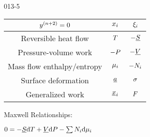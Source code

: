 \begin{mitframe}{013-5} %

    

\begin{longtable}{ | c | c | c | } 
 \hline
 	$ y^{(n+2)}= \init$& $\conjcoor$ & $\conjcoortwo_{\state}$ \\ \hline
	Reversible heat flow & $\Temp$ & $-\uline{\entropy}$ \\ \hline 
	Pressure-volume work & $-\p$ & $-\uline{\vol}$  \\ \hline
 	Mass flow enthalpy/entropy& $\chempot_{\state}$ & $-\nummoles_{\state}$ \\ \hline   
	Surface deformation & $\totalsa$ & $\surftens$ \\ \hline   
    Generalized work & $\gendisp_{\state}$ & $\force$ \\ \hline
 
 
 
\end{longtable}

    
    
\begin{listone}
        
    \item Maxwell Relationships:
        
    \item $\init = -\uline{\entropy}\mathrm{d}\Temp + \uline{\vol}\mathrm{d}\p - \sum\nolimits\nummoles_{\state}\mathrm{d}\chempot_{\state}$

    
\end{listone}			

\end{mitframe}